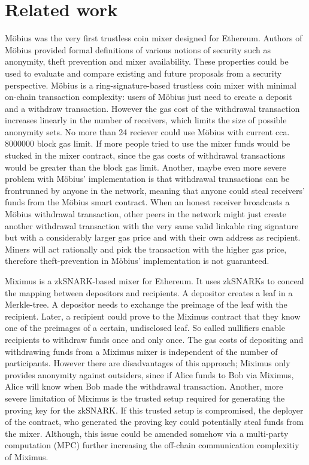 \documentclass[a4paper]{article}
\theoremstyle{definition}
\begin{document}
\section{Related work}
Möbius was the very first trustless coin mixer designed for Ethereum\cite{meiklejohn2018mobius}. Authors of Möbius provided formal definitions of various notions of security such as anonymity, theft prevention and mixer availability. These properties could be used to evaluate and compare existing and future proposals from a security perspective. Möbius is a ring-signature-based trustless coin mixer with minimal on-chain transaction complexity: users of Möbius just need to create a deposit and a withdraw transaction. However the gas cost of the withdrawal transaction increases linearly in the number of receivers, which limits the size of possible anonymity sets. No more than 24 reciever could use Möbius with current cca.$\num[group-separator={,}]{8000000}$  block gas limit. If more people tried to use the mixer funds would be stucked in the mixer contract, since the gas costs of withdrawal transactions would be greater than the block gas limit. Another, maybe even more severe problem with Möbius' implementation is that withdrawal transactions can be frontrunned by anyone in the network, meaning that anyone could steal receivers' funds from the Möbius smart contract. When an honest receiver broadcasts a Möbius withdrawal transaction, other peers in the network might just create another withdrawal transaction with the very same valid linkable ring signature but with a considerably larger gas price and with their own address as recipient. Miners will act rationally and pick the transaction with the higher gas price, therefore theft-prevention in Möbius' implementation is not guaranteed.     

Miximus is a zkSNARK-based mixer for Ethereum\cite{miximus2018}. It uses zkSNARKs to conceal the mapping between depositors and recipients. A depositor creates a leaf in a Merkle-tree. A depositor needs to exchange the preimage of the leaf with the recipient. Later, a recipient could prove to the Miximus contract that they know one of the preimages of a certain, undisclosed leaf. So called nullifiers enable recipients to withdraw funds once and only once. The gas costs of depositing and withdrawing funds from a Miximus mixer is independent of the number of participants. However there are disadvantages of this approach; Miximus only provides anonymity against outsiders, since if Alice funds to Bob via Miximus, Alice will know when Bob made the withdrawal transaction. Another, more severe limitation of Miximus is the trusted setup required for generating the proving key for the zkSNARK. If this trusted setup is compromised, the deployer of the contract, who generated the proving key could potentially steal funds from the mixer. Although, this issue could be amended somehow via a multi-party computation (MPC) further increasing the off-chain communication complexitiy of Miximus.
\end{document}
